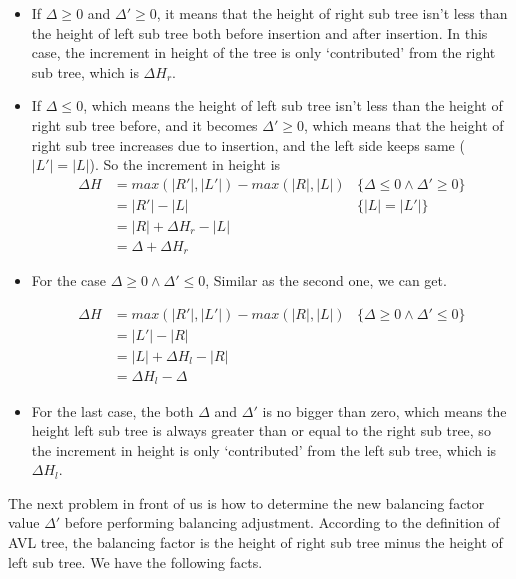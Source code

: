 \documentclass{article}
\begin{document}
\begin{itemize}
\item If $\Delta \geq 0$ and $\Delta' \geq 0$, it means that the height
of right sub tree isn't less than the height of left sub tree both
before insertion and after insertion. In this case, the increment in
height of the tree is only `contributed' from the right sub tree, which
is $\Delta H_r$.

\item If $\Delta \leq 0$, which means the height of left sub tree isn't
less than the height of right sub tree before, and it becomes
$\Delta' \geq 0$,
which means that the height of right sub tree increases due to insertion,
and the left side keeps same ($|L'|=|L|$). So the increment in height is
\[
\begin{array}{rll}
\Delta H & = max(|R'|, |L'|) - max (|R|, |L|) & \{\Delta \leq 0 \land \Delta' \geq 0 \}\\
         & = |R'|-|L| & \{|L|=|L'| \}\\
         & = |R|+\Delta H_r - |L| & \\
         & = \Delta + \Delta H_r &
\end{array}
\]

\item For the case $\Delta \geq 0 \land \Delta' \leq 0$, Similar as the
second one, we can get.

\[
\begin{array}{rll}
\Delta H & = max(|R'|, |L'|) - max (|R|, |L|) & \{\Delta \geq 0 \land \Delta' \leq 0 \}\\
         & = |L'|-|R| & \\
         & = |L|+\Delta H_l - |R| & \\
         & = \Delta H_l - \Delta&
\end{array}
\]

\item For the last case, the both $\Delta$ and $\Delta'$ is no bigger than
zero, which means the height left sub tree is always greater than or equal
 to the right sub tree, so the increment in height is only `contributed'
from the left sub tree, which is $\Delta H_l$.
\end{itemize}

The next problem in front of us is how to determine the new balancing
factor value $\Delta'$ before performing balancing adjustment.
According to the definition of AVL tree, the balancing factor is the
height of right sub tree minus the height of left sub tree. We have
the following facts.
\end{document}
